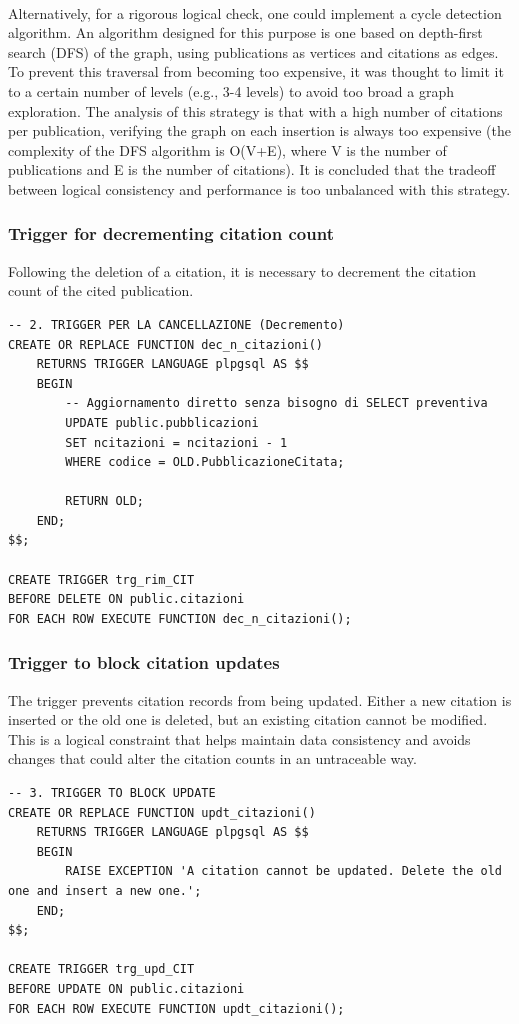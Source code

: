 \documentclass[a4paper,12pt]{article}
\begin{document}
\\Alternatively, for a rigorous logical check, one could implement a cycle detection algorithm. An algorithm designed for this purpose is one based on depth-first search (DFS) of the graph, using publications as vertices and citations as edges. To prevent this traversal from becoming too expensive, it was thought to limit it to a certain number of levels (e.g., 3-4 levels) to avoid too broad a graph exploration. The analysis of this strategy is that with a high number of citations per publication, verifying the graph on each insertion is always too expensive (the complexity of the DFS algorithm is O(V+E), where V is the number of publications and E is the number of citations). It is concluded that the tradeoff between logical consistency and performance is too unbalanced with this strategy.

\subsubsection{Trigger for decrementing citation count}
Following the deletion of a citation, it is necessary to decrement the citation count of the cited publication. 
\begin{lstlisting}
-- 2. TRIGGER PER LA CANCELLAZIONE (Decremento)
CREATE OR REPLACE FUNCTION dec_n_citazioni()
    RETURNS TRIGGER LANGUAGE plpgsql AS $$
    BEGIN
        -- Aggiornamento diretto senza bisogno di SELECT preventiva
        UPDATE public.pubblicazioni
        SET ncitazioni = ncitazioni - 1
        WHERE codice = OLD.PubblicazioneCitata;
        
        RETURN OLD;
    END;
$$;

CREATE TRIGGER trg_rim_CIT
BEFORE DELETE ON public.citazioni
FOR EACH ROW EXECUTE FUNCTION dec_n_citazioni();

\end{lstlisting}

\subsubsection{Trigger to block citation updates}
The trigger prevents citation records from being updated. Either a new citation is inserted or the old one is deleted, but an existing citation cannot be modified. This is a logical constraint that helps maintain data consistency and avoids changes that could alter the citation counts in an untraceable way.
\begin{lstlisting}
-- 3. TRIGGER TO BLOCK UPDATE
CREATE OR REPLACE FUNCTION updt_citazioni()
    RETURNS TRIGGER LANGUAGE plpgsql AS $$
    BEGIN
        RAISE EXCEPTION 'A citation cannot be updated. Delete the old one and insert a new one.';
    END;
$$;

CREATE TRIGGER trg_upd_CIT
BEFORE UPDATE ON public.citazioni
FOR EACH ROW EXECUTE FUNCTION updt_citazioni();

\end{lstlisting}
\end{document}
